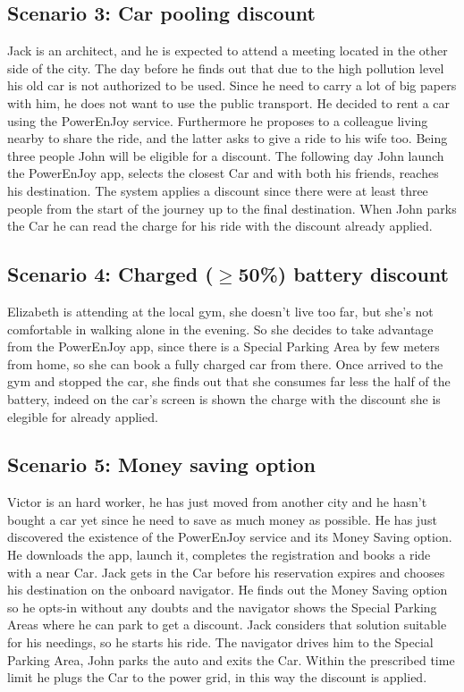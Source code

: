 \subsection{Scenario 3: Car pooling discount}
Jack is an architect, and he is expected to attend a meeting located in the other side of the city. The day before he finds out that due to the high pollution level his old car is not authorized to be used. Since he need to carry a lot of big papers with him, he does not want to use the public transport. He decided to rent a car using the PowerEnJoy service. Furthermore he proposes to a colleague living nearby to share the ride, and the latter asks to give a ride to his wife too. Being three people John will be eligible for a discount. The following day John launch the PowerEnJoy app, selects the closest Car and with both his friends, reaches his destination. The system applies a discount since there were at least three people from the start of the journey up to the final destination. When John parks the Car he can read the charge for his ride with the discount already applied.

\subsection{Scenario 4: Charged ($\geq$50\%) battery discount}
Elizabeth is attending at the local gym, she doesn't live too far, but she's not comfortable in walking alone in the evening. So she decides to take advantage from the PowerEnJoy app, since there is a Special Parking Area by few meters from home, so she can book a fully charged car from there. Once arrived to the gym and stopped the car, she finds out that she consumes far less the half of the battery, indeed on the car's screen is shown the charge with the discount she is elegible for already applied. %

\subsection{Scenario 5: Money saving option}
Victor is an hard worker, he has just moved from another city and he hasn't bought a car yet since he need to save as much money as possible. He has just discovered the existence of the PowerEnJoy service and its Money Saving option. He downloads the app, launch it, completes the registration and books a ride with a near Car. Jack gets in the Car before his reservation expires and chooses his destination on the onboard navigator. He finds out the Money Saving option so he opts-in without any doubts and the navigator shows the Special Parking Areas where he can park to get a discount. Jack considers that solution suitable for his needings, so he starts his ride. The navigator drives him to the Special Parking Area, John parks the auto and exits the Car. Within the prescribed time limit he plugs the Car to the power grid, in this way the discount is applied. 
